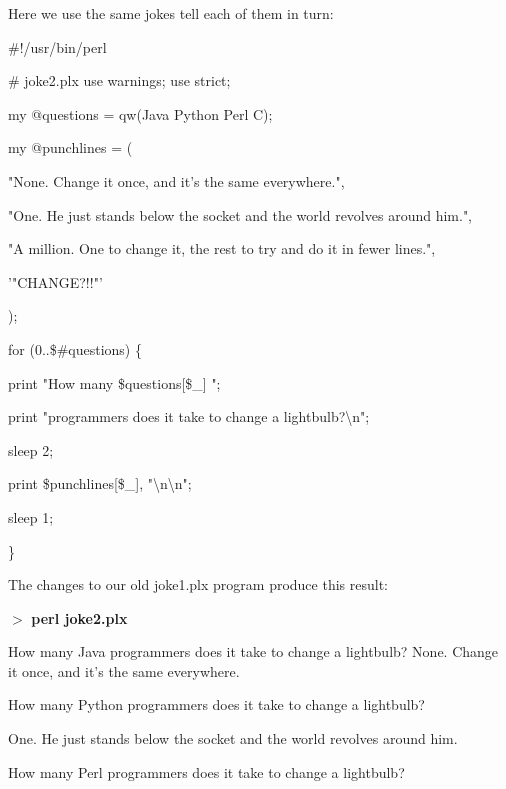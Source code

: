 \documentclass[a4paper,11pt]{book}
\begin{document}
\noindent Here we use the same jokes tell each of them in turn:

\noindent 

\noindent \#!/usr/bin/perl

\noindent \# joke2.plx use warnings; use strict;

\noindent 

\noindent my @questions = qw(Java Python Perl C);

\noindent my @punchlines = (

\noindent "None. Change it once, and it's the same everywhere.",

\noindent "One. He just stands below the socket and the world revolves around him.",

\noindent "A million. One to change it, the rest to try and do it in fewer lines.",

\noindent '"CHANGE?!!"'

\noindent );

\noindent 

\noindent for (0..\$\#questions) \{

\noindent print "How many \$questions[\$\_] ";

\noindent print "programmers does it take to change a lightbulb?\textbackslash n";

\noindent sleep 2;

\noindent print \$punchlines[\$\_], "\textbackslash n\textbackslash n";

\noindent sleep 1;

\noindent \}

\noindent 

\noindent 

\noindent The changes to our old joke1.plx program produce this result:

\noindent 

\noindent $>$ \textbf{perl joke2.plx}

\noindent How many Java programmers does it take to change a lightbulb? None. Change it once, and it's the same everywhere.

\noindent 

\noindent How many Python programmers does it take to change a lightbulb?

\noindent One. He just stands below the socket and the world revolves around him.

\noindent 

\noindent How many Perl programmers does it take to change a lightbulb?
\end{document}
